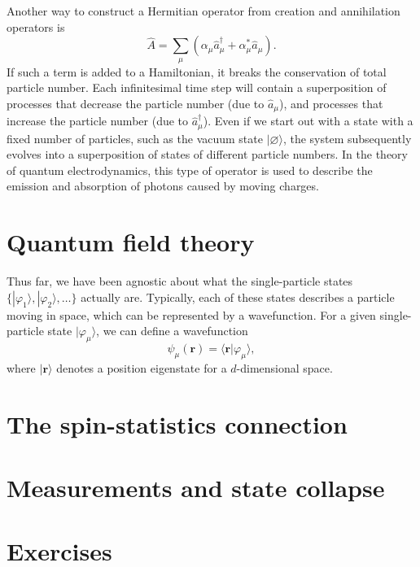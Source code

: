 \documentclass[pra,12pt]{revtex4}
\begin{document}
Another way to construct a Hermitian operator from creation and
annihilation operators is
$$\hat{A} = \sum_\mu \left(\alpha_\mu \hat{a}_\mu^\dagger + \alpha^*_\mu \hat{a}_\mu\right).$$
If such a term is added to a Hamiltonian, it breaks the conservation
of total particle number.  Each infinitesimal time step will contain a
superposition of processes that decrease the particle number (due to
$\hat{a}_\mu$), and processes that increase the particle number (due
to $\hat{a}_\mu^\dagger$).  Even if we start out with a state with a
fixed number of particles, such as the vacuum state
$|\varnothing\rangle$, the system subsequently evolves into a
superposition of states of different particle numbers.  In the
theory of quantum electrodynamics, this type of operator is used to
describe the emission and absorption of photons caused by moving
charges.

\section{Quantum field theory}
\label{sec:qft}

Thus far, we have been agnostic about what the single-particle states
$\{|\varphi_1\rangle,|\varphi_2\rangle,\dots\}$ actually are.
Typically, each of these states describes a particle moving in space,
which can be represented by a wavefunction.  For a given
single-particle state $|\varphi_\mu\rangle$, we can define a
wavefunction
$$\psi_\mu(\mathbf{r}) = \langle\mathbf{r}|\varphi_\mu\rangle,$$
where $|\mathbf{r}\rangle$ denotes a position eigenstate for a
$d$-dimensional space.


\section{The spin-statistics connection}
\label{sec:spinstats}

\section{Measurements and state collapse}

\section*{Exercises}
\end{document}
